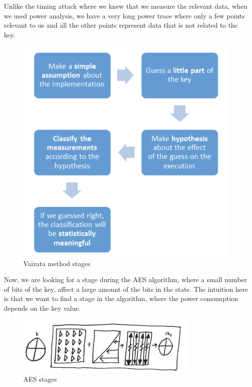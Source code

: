 Unlike the timing attack where we knew that we measure the relevant data, when we used power analysis, we have a very long power trace where only a few points relevant to us and all the other points represent data that is not related to the key.

\begin{figure}[!ht]
    \centering
    \includegraphics[height=0.9\textwidth]{images/Lecture6/vaizata.png}
    \caption{Vaizata method stages} \label{fig:vaizata}
\end{figure}

Now, we are looking for a stage during the AES algorithm, where a small number of bits of the key, affect a large amount of the bits in the state. 
The intuition here is that we want to find a stage in the algorithm, where the power consumption depends on the key value.

\begin{figure}[!ht]
    \centering
    \includegraphics[width=0.8\textwidth]{images/Lecture6/AES-stages-figure.png}
    \caption{AES stages} \label{fig:aes-stages}
\end{figure}


